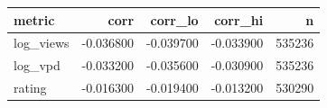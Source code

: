 \begin{tabular}{lrrrr}
\toprule
metric & corr & corr_lo & corr_hi & n \\
\midrule
log_views & -0.036800 & -0.039700 & -0.033900 & 535236 \\
log_vpd & -0.033200 & -0.035600 & -0.030900 & 535236 \\
rating & -0.016300 & -0.019400 & -0.013200 & 530290 \\
\bottomrule
\end{tabular}
